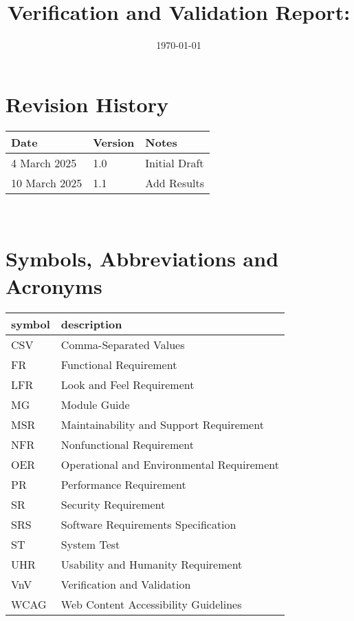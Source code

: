 \documentclass[12pt, titlepage]{article}
\begin{document}
\title{Verification and Validation Report: \progname} 
\author{\authname}
\date{\today}
	
\maketitle


\section{Revision History}

\begin{tabularx}{\textwidth}{p{3cm}p{2cm}X} \toprule {\bf Date} & {\bf Version}
& {\bf Notes}\\
\midrule
4 March 2025 & 1.0 & Initial Draft\\
10 March 2025 & 1.1 & Add Results\\
\bottomrule
\end{tabularx}

~\newpage

\section{Symbols, Abbreviations and Acronyms}

\renewcommand{\arraystretch}{1.2}
\begin{tabular}{l l} 
  \toprule		
  \textbf{symbol} & \textbf{description}\\
  \midrule
  CSV & Comma-Separated Values\\
  FR & Functional Requirement\\
  LFR & Look and Feel Requirement\\
  MG & Module Guide\\
  MSR & Maintainability and Support Requirement\\
  NFR & Nonfunctional Requirement\\
  OER & Operational and Environmental Requirement\\
  PR & Performance Requirement\\
  SR & Security Requirement\\
  SRS & Software Requirements Specification\\
  ST & System Test\\
  UHR & Usability and Humanity Requirement\\
  VnV & Verification and Validation\\
  WCAG & Web Content Accessibility Guidelines\\
  \bottomrule
\end{tabular}\\
\end{document}
